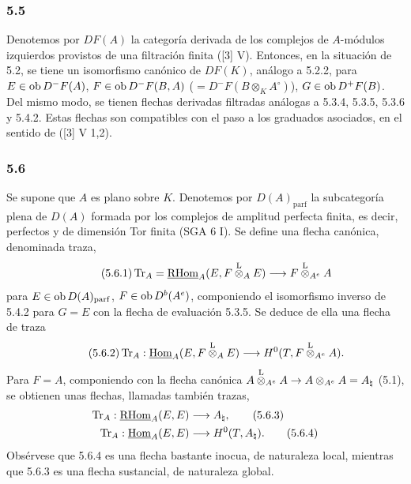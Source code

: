 \subsubsection*{5.5}

Denotemos por $DF(A)$ la categoría derivada de los complejos de $A$-módulos izquierdos provistos de una filtración finita ([3] V). Entonces, en la situación de 5.2, se tiene un isomorfismo canónico de $DF(K)$, análogo a 5.2.2, para $E\in\operatorname{ob} D^-F(A)$, $F\in\operatorname{ob} D^-F(B,A)$ ($=D^-F(B\otimes_KA^\circ)$), $G\in\operatorname{ob} D^+F(B)$. Del mismo modo, se tienen flechas derivadas filtradas análogas a 5.3.4, 5.3.5, 5.3.6 y 5.4.2. Estas flechas son compatibles con el paso a los graduados asociados, en el sentido de ([3] V 1,2).

\subsubsection*{5.6}

Se supone que $A$ es plano sobre $K$. Denotemos por $D(A)_{\mathrm{parf}}$ la subcategoría plena de $D(A)$ formada por los complejos de amplitud perfecta finita, es decir, perfectos y de dimensión Tor finita (SGA 6 I). Se define una flecha canónica, denominada traza,
\begin{equation}\tag{5.6.1}
\operatorname{Tr}_A=\underline{\mathrm{RHom}}_A(E,F\overset{\mathrm L}{\otimes}_AE)\longrightarrow F\overset{\mathrm L}{\otimes}_{A^e}A
\end{equation}
para $E\in\operatorname{ob} D(A)_{\mathrm{parf}}$, $F\in\operatorname{ob} D^b(A^e)$, componiendo el isomorfismo inverso de 5.4.2 para $G=E$ con la flecha de evaluación 5.3.5. Se deduce de ella una flecha de traza
\begin{equation}\tag{5.6.2}
\operatorname{Tr}_A:\underline{\operatorname{Hom}}_A(E,F\overset{\mathrm L}{\otimes}_AE)\longrightarrow H^0(T,F\overset{\mathrm L}{\otimes}_{A^e}A).
\end{equation}
Para $F=A$, componiendo con la flecha canónica $A\overset{\mathrm L}{\otimes}_{A^e}A\to A\otimes_{A^e}A=A_\natural$ (5.1), se obtienen unas flechas, llamadas también trazas,
\begin{align}
\operatorname{Tr}_A:\underline{\mathrm{RHom}}_A(E,E)&\longrightarrow A_\natural,\tag{5.6.3}\\
\operatorname{Tr}_A:\underline{\operatorname{Hom}}_A(E,E)&\longrightarrow H^0(T,A_\natural).\tag{5.6.4}
\end{align}
Obsérvese que 5.6.4 es una flecha bastante inocua, de naturaleza local, mientras que 5.6.3 es una flecha sustancial, de naturaleza global.

